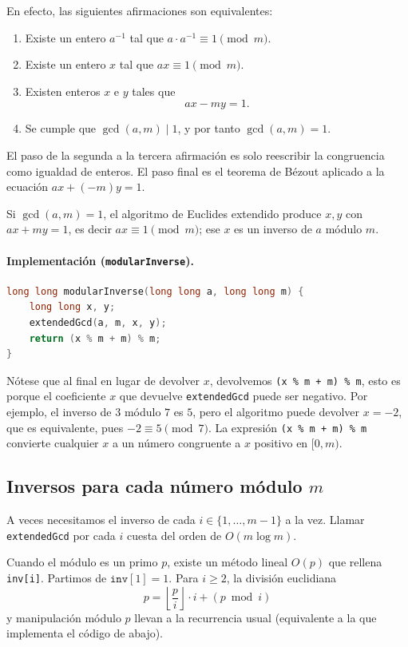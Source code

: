 En efecto, las siguientes afirmaciones son equivalentes:
\begin{enumerate}
    \item Existe un entero $a^{-1}$ tal que $a \cdot a^{-1} \equiv 1 \pmod{m}$.
    \item Existe un entero $x$ tal que $ax \equiv 1 \pmod{m}$.
    \item Existen enteros $x$ e $y$ tales que
    \[
    ax - my = 1.
    \]
    \item Se cumple que $\gcd(a,m) \mid 1$, y por tanto $\gcd(a,m) = 1$.
\end{enumerate}
El paso de la segunda a la tercera afirmación es solo reescribir la congruencia como igualdad de enteros. El paso final es el teorema de Bézout aplicado a la ecuación $ax + (-m)y = 1$.

Si $\gcd(a,m)=1$, el algoritmo de Euclides extendido produce $x,y$ con $ax + my = 1$, es decir $ax \equiv 1 \pmod{m}$; ese $x$ es un inverso de $a$ módulo $m$.

\paragraph{Implementación (\texttt{modularInverse}).}

\begin{lstlisting}[language=C++]
long long modularInverse(long long a, long long m) {
    long long x, y;
    extendedGcd(a, m, x, y);
    return (x % m + m) % m;
}
\end{lstlisting}
Nótese que al final en lugar de devolver $x$, devolvemos \verb|(x % m + m) % m|, esto es porque el coeficiente $x$ que devuelve \texttt{extendedGcd} puede ser negativo. Por ejemplo, el inverso de $3$ módulo $7$ es $5$, pero el algoritmo puede devolver $x = -2$, que es equivalente, pues $-2 \equiv 5 \pmod 7$. La expresión \verb|(x % m + m) % m| convierte cualquier $x$ a un número congruente a $x$ positivo en $[0, m)$.

\subsection*{Inversos para cada número módulo $m$}

A veces necesitamos el inverso de cada $i \in \{1,\ldots,m-1\}$ a la vez. Llamar \texttt{extendedGcd} por cada $i$ cuesta del orden de $O(m \log m)$.

Cuando el módulo es un primo $p$, existe un método lineal $O(p)$ que rellena \texttt{inv[i]}. Partimos de $\texttt{inv}[1]=1$. Para $i \ge 2$, la división euclidiana
\[
p = \left\lfloor \frac{p}{i} \right\rfloor \cdot i + (p \bmod i)
\]
y manipulación módulo $p$ llevan a la recurrencia usual (equivalente a la que implementa el código de abajo).

